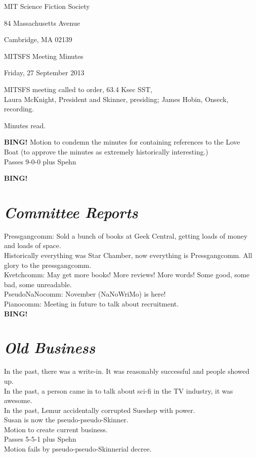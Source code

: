 \documentclass[10pt]{article}
\newcommand{\bing}{{\bf BING!} }
\newcommand{\goto}[1]{\bing \vskip 12pt \section*{{\em{#1}}}}
\newcommand{\ps}{ plus Spehn\xspace}
\newcommand{\skinner}{Laura McKnight, President and Skinner}
\newcommand{\onseck}{James Hobin, Onseck}
\newcommand{\meetingdate}{Friday, 27 September 2013}
\begin{document}
\begin{center}

MIT Science Fiction Society

84 Massachusetts Avenue

Cambridge, MA 02139

\vspace{12pt}

MITSFS Meeting Minutes

\meetingdate

\end{center}

\vspace{18pt}

\setlength{\parskip}{6pt}

\noindent
MITSFS meeting called to order, 63.4 Ksec SST, \\
\skinner, presiding; \onseck, recording.

Minutes read.

\bing
Motion to condemn the minutes for containing references to the Love Boat
(to approve the minutes as extremely historically interesting.) \\
Passes 9-0-0 \ps

\goto{Committee Reports}
Pressgangcomm: Sold a bunch of books at Geek Central, getting loads of money and loads of space. \\
Historically everything was Star Chamber, now everything is Pressgangcomm. All glory to the pressgangcomm. \\
Kvetchcomm: May get more books! More reviews! More words! Some good, some bad, some unreadable. \\
PseudoNaNocomm: November (NaNoWriMo) is here! \\
Pianocomm: Meeting in future to talk about recruitment. \\

\goto{Old Business}
In the past, there was a write-in. It was reasonably successful and people showed up. \\
In the past, a person came in to talk about sci-fi in the TV industry, it was awesome. \\
In the past, Lemur accidentally corrupted Sueshep with power. \\
Susan is now the pseudo-pseudo-Skinner. \\

Motion to create current business. \\
Passes 5-5-1 \ps \\
Motion fails by pseudo-pseudo-Skinnerial decree. \\
\end{document}

